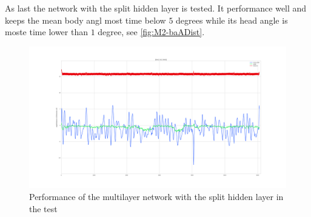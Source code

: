 \newline
As last the network with the split hidden layer is tested. It performance well and keeps the mean body angl most time below $5$ degrees while its head angle is moste time lower than $1$ degree, see \autoref{fig:M2-baADist}.
\begin{figure}[htpb]
  \centering
  \includegraphics[width=\textwidth]{figures/plots/M2-baADist}
  \caption{ Performance of the multilayer network with the split hidden layer in the test }
  \label{fig:M2-baADist}
\end{figure}




